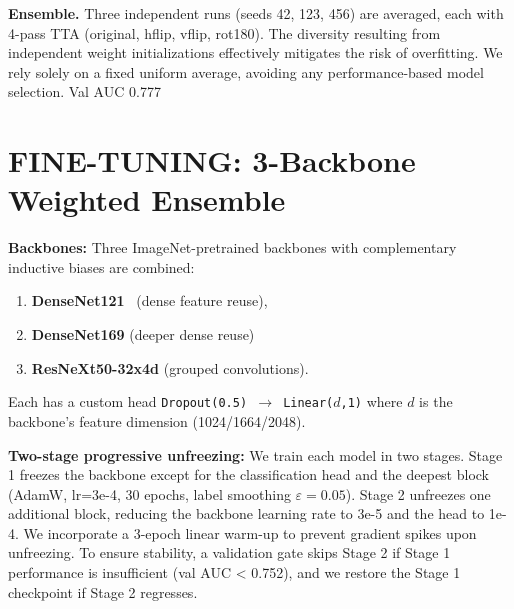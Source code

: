 \documentclass[a4paper, 10pt, twocolumn]{article}
\begin{document}
\textbf{Ensemble.}
Three independent runs (seeds 42, 123, 456) are averaged, each with
4-pass TTA (original, hflip, vflip, rot180). 
The diversity resulting from independent weight initializations effectively mitigates the risk of  overfitting. We rely solely on a fixed uniform average, avoiding any performance-based model selection. Val AUC 0.777


\section{FINE-TUNING: 3-Backbone Weighted Ensemble}

\textbf{Backbones:} Three ImageNet-pretrained backbones with complementary
inductive biases are combined: 
\begin{enumerate}[topsep=0pt, itemsep=1pt]
    \item \textbf{DenseNet121}~\cite{huang2017densely} (dense feature reuse),
    \item  \textbf{DenseNet169} (deeper dense reuse)
    \item \textbf{ResNeXt50-32x4d} (grouped convolutions). 
\end{enumerate}


Each has a custom head \texttt{Dropout(0.5) $\to$ Linear($d$,1)} where $d$ is the backbone's feature dimension (1024/1664/2048).
    
\textbf{Two-stage progressive unfreezing:} We train each model in two stages. Stage 1 freezes the backbone except for the classification head and the deepest block (AdamW, lr=3e-4, 30 epochs, label smoothing $\varepsilon=0.05$). Stage 2 unfreezes one additional block, reducing the backbone learning rate to 3e-5 and the head to 1e-4. We incorporate a 3-epoch linear warm-up to prevent gradient spikes upon unfreezing. To ensure stability, a validation gate skips Stage 2 if Stage 1 performance is insufficient (val AUC < 0.752), and we restore the Stage 1 checkpoint if Stage 2 regresses.
\end{document}
